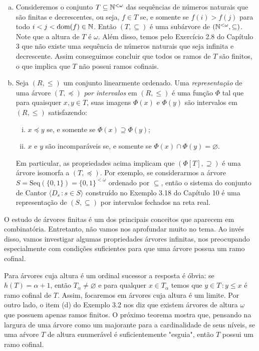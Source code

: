 \documentclass[a4paper]{article}
\begin{document}
\begin{exemplo}
\begin{enumerate}[(a)]
   \item Consideremos o conjunto
    \(T\subseteq \mathbb{N}^{<\omega}\)
     das sequências de números naturais que são finitas e
    decrescentes, ou seja, \(f\in T \) se, e somente se  \(f(i)>f(j)\)  para todo
    \(i<j<\operatorname{dom}(f)\in\mathbb{N}\).  Então \((T,\subseteq)\) é uma subárvore de
    \((\mathbb{N}^{<\omega},\subseteq)\). Note que a altura de  \(T\) é 
    \(\omega\). Além disso, temos pelo Exercício 2.8 do Capítulo 3 que não
    existe uma sequência de números naturais que seja infinita e decrescente.
    Assim conseguimos concluir que todos os ramos de \(T\) são finitos, o
    que implica que \(T\) não possui ramos cofinais.

  \item Seja \((R,\leq)\) um conjunto linearmente ordenado.
    Uma \emph{representação} de uma árvore \((T,\preceq)\)
    \emph{por intervalos} em \((R,\leq)\) é uma função \(\Phi\) tal que para
    quaisquer \(x,y\in T\),
    suas imagens \(\Phi(x)\) e \(\Phi(y)\) são intervalos em \((R,\leq)\) satisfazendo:
    \begin{enumerate}[(i)]
    \item \(x\preceq y\) se, e somente se \(\Phi(x)\supseteq\Phi(y)\); 
    \item \(x\) e \(y\) são incomparáveis se, e somente se \(\Phi(x)\cap\Phi(y) =\varnothing\).
    \end{enumerate}
    Em particular, as propriedades acima implicam que \((\Phi[T],\supseteq)\) é
    uma árvore isomorfa a \((T,\preceq)\). Por exemplo, se considerarmos
    a árvore \(S=\text{Seq}(\{0,1\})=\{0,1\}^{<\omega}\) ordenado por \(\subseteq\),
    então o sistema do conjunto de Cantor \(\langle D_s \,\colon s\in S\rangle\) construído no Exemplo
    3.18 do  Capítulo 10 é uma representação de \((S,\subseteq)\) por intervalos
    fechados na reta real.
    \end{enumerate}
  \end{exemplo}
  
  O estudo de árvores finitas é um dos  principais conceitos que aparecem em
  combinatória. Entretanto, não vamos nos aprofundar muito no tema. Ao invés
  disso, vamos investigar algumas propriedades árvores infinitas, nos preocupando
  especialmente com condições suficientes para que uma árvore possua um ramo cofinal.

  Para árvores cuja altura é um ordinal sucessor a resposta é óbvia: se \(h(T)=\alpha +1\),
  então \(T_\alpha\neq\varnothing\) e para qualquer \(x\in T_\alpha\) temos que
  \({{y\in T \,\colon y\leq x}}\) é ramo cofinal de \(T\). Assim, focaremos em
  árvores cuja altura é um limite. Por outro lado, o item (d) do Exemplo 3.2 nos diz que
  existem árvores de altura \(\omega\) que possuem apenas ramos finitos. O
  próximo teorema mostra que,  pensando na largura de uma árvore como um
  majorante para a cardinalidade de seus níveis, se uma aŕvore \(T\) de altura
  enumerável é suficientemente "esguia", então \(T\) possui um ramo cofinal.
\end{document}
